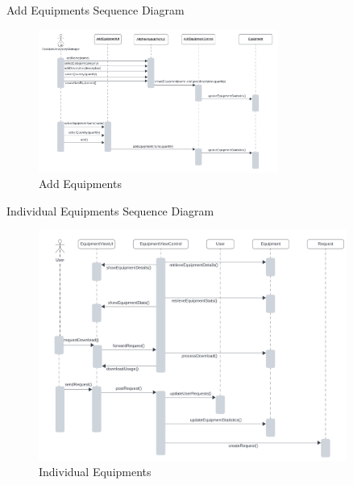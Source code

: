 \documentclass[20pt]{beamer}
\numberwithin{figure}{section}
\begin{document}
\begin{frame}{Add Equipments Sequence Diagram}

     \begin{figure}
        \centering
        \includegraphics[width= 0.7\textwidth , height= 0.6\paperheight]{AddEquipmentsSeq.png}
        \caption{Add Equipments}
        \label{fig:30}
    \end{figure}

\end{frame}

\begin{frame}{Individual Equipments Sequence Diagram}

     \begin{figure}
        \centering
        \includegraphics[width= 0.9\textwidth , height= 0.6\paperheight]{IndividualEquipmentseq.png}
        \caption{Individual Equipments}
        \label{fig:31}
    \end{figure}

\end{frame}
\end{document}
